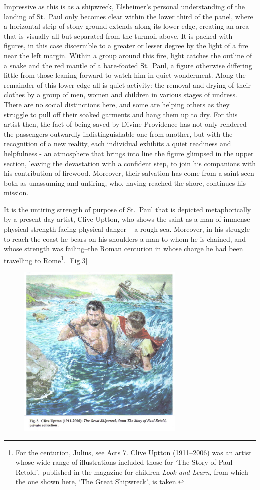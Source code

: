 \documentclass[a4paper,12pt]{article}
\begin{document}
Impressive as this is as a shipwreck, Elsheimer's personal
understanding of the landing of St.~Paul only becomes clear within the
lower third of the panel, where a horizontal strip of stony ground
extends along its lower edge, creating an area that is visually all
but separated from the turmoil above.  It is packed with figures, in
this case discernible to a greater or lesser degree by the light of a
fire near the left margin.  Within a group around this fire, light
catches the outline of a snake and the red mantle of a bare-footed
St.~Paul, a figure otherwise differing little from those leaning
forward to watch him in quiet wonderment.  Along the remainder of this
lower edge all is quiet activity: the removal and drying of their
clothes by a group of men, women and children in various stages of
undress.  There are no social distinctions here, and some are helping
others as they struggle to pull off their soaked garments and hang
them up to dry.  For this artist then, the fact of being saved by
Divine Providence has not only rendered the passengers outwardly
indistinguishable one from another, but with the recognition of a new
reality, each individual exhibits a quiet readiness and helpfulness -
an atmosphere that brings into line the figure glimpsed in the upper
section, leaving the devastation with a confident step, to join his
companions with his contribution of firewood.  Moreover, their
salvation has come from a saint seen both as unassuming and untiring,
who, having reached the shore, continues his mission.

It is the untiring strength of purpose of St.~Paul that is depicted
metaphorically by a present-day artist, Clive Uptton, who shows the
saint as a man of immense physical strength facing physical danger – a
rough sea.  Moreover, in his struggle to reach the coast he bears on
his shoulders a man to whom he is chained, and whose strength was
failing--the Roman centurion in whose charge he had been travelling to
Rome\footnote{For the centurion, Julius, see Acts 7.  Clive Uptton
  (1911--2006) was an artist whose wide range of illustrations
  included those for `The Story of Paul Retold', published in the
  magazine for children \textit{Look and Learn}, from which the one
  shown here, `The Great Shipwreck', is taken.}. [Fig.3]
\begin{figure}[htbp]
\centering
\includegraphics[width=8cm]{fig3.jpg}
\end{figure}
\end{document}
